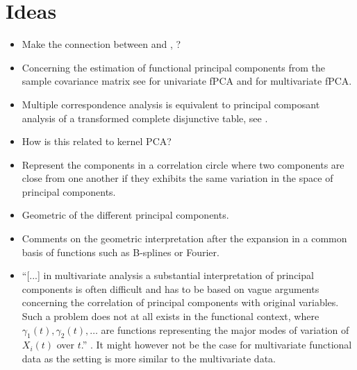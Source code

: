 \section{Ideas} %
\label{sec:ideas}

\begin{itemize}
    \item Make the connection between \cite{happMultivariateFunctionalPrincipal2015} and \cite{berrenderoPrincipalComponentsMultivariate2011}, \cite{yangFunctionalSingularComponent2011}?
    \item Concerning the estimation of functional principal components from the sample covariance matrix see \cite[Chap. 8.4]{ramsayFunctionalDataAnalysis2005} for univariate fPCA and \cite{happMultivariateFunctionalPrincipal2015} for multivariate fPCA.
    \item Multiple correspondence analysis is equivalent to principal composant analysis of a transformed complete disjunctive table, see \cite{pagesMultipleFactorAnalysis2014}.
    \item How is this related to kernel PCA?
    \item Represent the components in a correlation circle where two components are close from one another if they exhibits the same variation in the space of principal components.
    \item Geometric of the different principal components.
    \item Comments on the geometric interpretation after the expansion in a common basis of functions such as B-splines or Fourier.
    \item ``[...] in multivariate analysis a substantial interpretation of principal components is often difficult and has to be based on vague arguments concerning the correlation of principal components with original variables. Such a problem does not at all exists in the functional context, where $\gamma_1(t), \gamma_2(t), \dots$ are functions representing the major modes of variation of $X_i(t)$ over $t$.'' \cite{benkoCommonFunctionalPrincipal2009}. It might however not be the case for multivariate functional data as the setting is more similar to the multivariate data.
\end{itemize}


